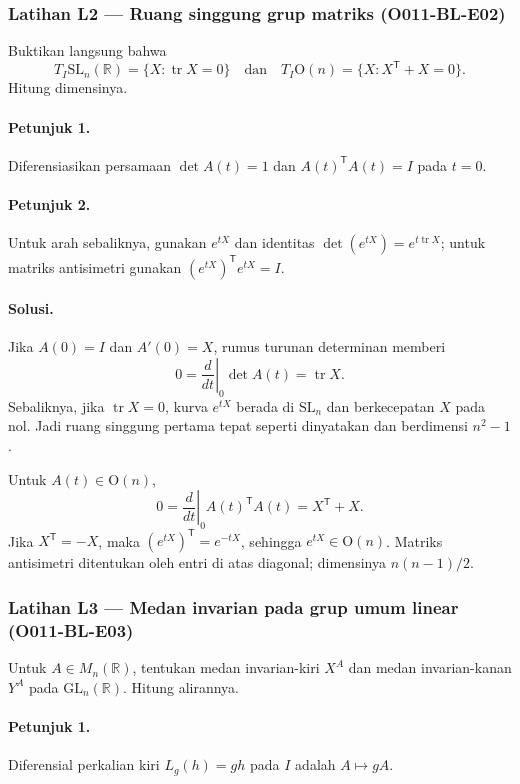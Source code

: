 \subsubsection*{Latihan L2 — Ruang singgung grup matriks (O011-BL-E02)}
\label{o011-bl-e02}

Buktikan langsung bahwa
\[
 T_I\mathrm{SL}_n(\mathbb R)=\{X:\operatorname{tr}X=0\}
 \quad\text{dan}\quad
 T_I\mathrm O(n)=\{X:X^{\mathsf T}+X=0\}.
\]
Hitung dimensinya.

\paragraph{Petunjuk 1.}
Diferensiasikan persamaan $\det A(t)=1$ dan
$A(t)^{\mathsf T}A(t)=I$ pada $t=0$.

\paragraph{Petunjuk 2.}
Untuk arah sebaliknya, gunakan $e^{tX}$ dan identitas
$\det(e^{tX})=e^{t\operatorname{tr}X}$; untuk matriks antisimetri gunakan
$(e^{tX})^{\mathsf T}e^{tX}=I$.

\paragraph{Solusi.}
Jika $A(0)=I$ dan $A'(0)=X$, rumus turunan determinan memberi
\[
 0=\left.\frac d{dt}\right|_0\det A(t)=\operatorname{tr}X.
\]
Sebaliknya, jika $\operatorname{tr}X=0$, kurva $e^{tX}$ berada di
$\mathrm{SL}_n$ dan berkecepatan $X$ pada nol. Jadi ruang singgung pertama
tepat seperti dinyatakan dan berdimensi $n^2-1$.

Untuk $A(t)\in\mathrm O(n)$,
\[
 0=\left.\frac d{dt}\right|_0 A(t)^{\mathsf T}A(t)=X^{\mathsf T}+X.
\]
Jika $X^{\mathsf T}=-X$, maka
$(e^{tX})^{\mathsf T}=e^{-tX}$, sehingga $e^{tX}\in\mathrm O(n)$. Matriks
antisimetri ditentukan oleh entri di atas diagonal; dimensinya
$n(n-1)/2$.

\subsubsection*{Latihan L3 — Medan invarian pada grup umum linear (O011-BL-E03)}
\label{o011-bl-e03}

Untuk $A\in M_n(\mathbb R)$, tentukan medan invarian-kiri $X^A$ dan medan
invarian-kanan $Y^A$ pada $\mathrm{GL}_n(\mathbb R)$. Hitung alirannya.

\paragraph{Petunjuk 1.}
Diferensial perkalian kiri $L_g(h)=gh$ pada $I$ adalah $A\mapsto gA$.

